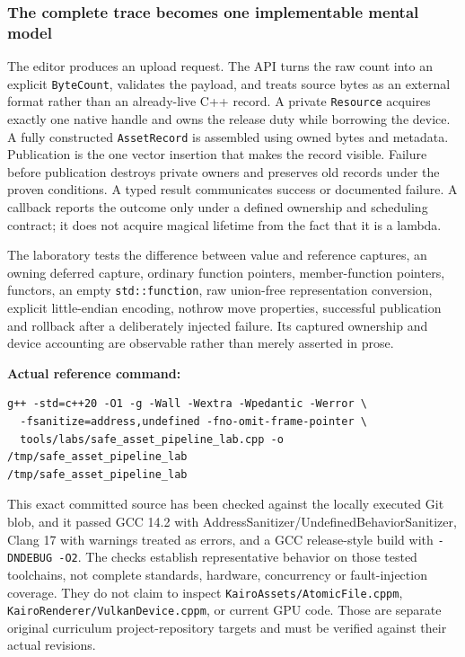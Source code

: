 \subsubsection{The complete trace becomes one implementable mental model}\label{the-complete-trace-becomes-one-implementable-mental-model}

The editor produces an upload request. The API turns the raw count into an explicit \texttt{ByteCount}, validates the payload, and treats source bytes as an external format rather than an already-live C++ record. A private \texttt{Resource} acquires exactly one native handle and owns the release duty while borrowing the device. A fully constructed \texttt{AssetRecord} is assembled using owned bytes and metadata. Publication is the one vector insertion that makes the record visible. Failure before publication destroys private owners and preserves old records under the proven conditions. A typed result communicates success or documented failure. A callback reports the outcome only under a defined ownership and scheduling contract; it does not acquire magical lifetime from the fact that it is a lambda.

The laboratory tests the difference between value and reference captures, an owning deferred capture, ordinary function pointers, member-function pointers, functors, an empty \texttt{std::function}, raw union-free representation conversion, explicit little-endian encoding, nothrow move properties, successful publication and rollback after a deliberately injected failure. Its captured ownership and device accounting are observable rather than merely asserted in prose.

\textbf{Actual reference command:}

\begin{verbatim}
g++ -std=c++20 -O1 -g -Wall -Wextra -Wpedantic -Werror \
  -fsanitize=address,undefined -fno-omit-frame-pointer \
  tools/labs/safe_asset_pipeline_lab.cpp -o /tmp/safe_asset_pipeline_lab
/tmp/safe_asset_pipeline_lab
\end{verbatim}

This exact committed source has been checked against the locally executed Git blob, and it passed GCC 14.2 with AddressSanitizer/UndefinedBehaviorSanitizer, Clang 17 with warnings treated as errors, and a GCC release-style build with \texttt{-DNDEBUG\ -O2}. The checks establish representative behavior on those tested toolchains, not complete standards, hardware, concurrency or fault-injection coverage. They do not claim to inspect \texttt{KairoAssets/AtomicFile.cppm}, \texttt{KairoRenderer/VulkanDevice.cppm}, or current GPU code. Those are separate original curriculum project-repository targets and must be verified against their actual revisions.

